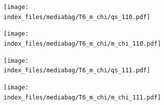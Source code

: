 \documentclass[
  11pt,
  letterpaper,
]{scrreprt}
\begin{document}
\begin{figure}

\begin{minipage}{0.50\linewidth}

\begin{figure}[H]

{\centering \texttt{[image: index\_files/mediabag/T6\_m\_chi/qs\_110.pdf]}

}


\end{figure}%

\end{minipage}%
%
\begin{minipage}{0.50\linewidth}

\begin{figure}[H]

{\centering \texttt{[image: index\_files/mediabag/T6\_m\_chi/m\_chi\_110.pdf]}

}


\end{figure}%

\end{minipage}%

\end{figure}%

\begin{figure}

\begin{minipage}{0.50\linewidth}

\begin{figure}[H]

{\centering \texttt{[image: index\_files/mediabag/T6\_m\_chi/qs\_111.pdf]}

}


\end{figure}%

\end{minipage}%
%
\begin{minipage}{0.50\linewidth}

\begin{figure}[H]

{\centering \texttt{[image: index\_files/mediabag/T6\_m\_chi/m\_chi\_111.pdf]}

}


\end{figure}%

\end{minipage}%

\end{figure}%
\end{document}
